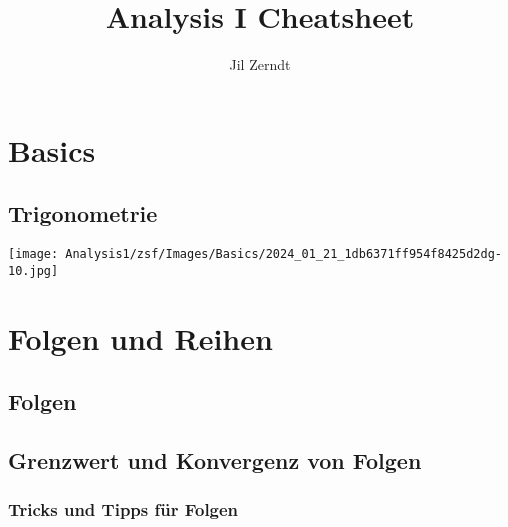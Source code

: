 \documentclass[a4paper, fontsize = 7pt, landscape]{scrartcl}
\author{Jil Zerndt}
\title{Analysis I Cheatsheet}
\subtitle{}
\begin{document}
	\begin{multicols*}{3}
		\thispagestyle{TitlePageStyle}
		\maketitle
        \vspace{1mm}
            \section{Basics}
                
                
                \raggedcolumns
                \columnbreak
                \subsection{Trigonometrie}
                
                \raggedcolumns
                \columnbreak
                
                
                \texttt{[image: Analysis1/zsf/Images/Basics/2024\_01\_21\_1db6371ff954f8425d2dg-10.jpg]}
                

        \raggedcolumns
        \columnbreak
        
        \section{Folgen und Reihen}
            \subsection{Folgen}
            
            
            \subsection{Grenzwert und Konvergenz von Folgen}
    		  
                \subsubsection{Tricks und Tipps für Folgen}
                
                
                
                
                


\end{multicols*}
\end{document}
